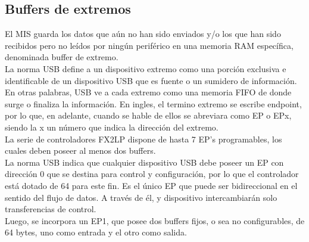 \subsection{Buffers de extremos}
	El MIS guarda los datos que aún no han sido enviados y/o los que han sido recibidos pero no leídos por ningún periférico en una memoria RAM específica, denominada buffer de extremo.\\
	
	La norma USB define a un dispositivo extremo como una porción exclusiva e identificable de un dispositivo USB que es fuente o un sumidero de información. En otras palabras, USB ve a cada extremo como una memoria FIFO de donde surge o finaliza la información. En ingles, el termino extremo se escribe endpoint, por lo que, en adelante, cuando se hable de ellos se abreviara como EP o EPx, siendo la x un número que indica la dirección del extremo.\\
	
	La serie de controladores FX2LP dispone de hasta 7 EP's programables, los cuales deben poseer al menos dos buffers.\\
	
	La norma USB indica que cualquier dispositivo USB debe poseer un EP con dirección 0 que se destina para control y configuración, por lo que el controlador está dotado de \SI{64}{\byte} para este fin. Es el único EP que puede ser bidireccional en el sentido del flujo de datos. A través de él, \host y dispositivo intercambiarán solo transferencias de control.\\
	
	Luego, se incorpora un EP1, que posee dos buffers fijos, o sea no configurables, de 64 bytes, uno como entrada y el otro como salida.\\
	
